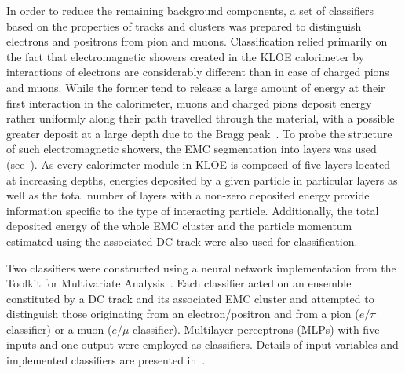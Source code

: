 In order to reduce the remaining background components, a set of classifiers based on the properties of tracks and clusters was prepared to distinguish electrons and positrons from pion and muons. Classification relied primarily on the fact that electromagnetic showers created in the KLOE calorimeter by interactions of electrons are considerably different than in case of charged pions and muons. While the former tend to release a large amount of energy at their first interaction in the calorimeter, muons and charged pions deposit energy rather uniformly along their path travelled through the material, with a possible greater deposit at a large depth due to the Bragg peak~\cite{graziani_anns}. To probe the structure of such electromagnetic showers, the EMC segmentation into layers was used (see~). As every calorimeter module in KLOE is composed of five layers located at increasing depths, energies deposited by a given particle in particular layers as well as the total number of layers with a non-zero deposited energy provide information specific to the type of interacting particle. Additionally, the total deposited energy of the whole EMC cluster and the particle momentum estimated using the associated DC track were also used for classification. 

Two classifiers were constructed using a neural network implementation from the Toolkit for Multivariate Analysis~\cite{Hocker:2007ht}. Each classifier acted on an ensemble constituted by a DC track and its associated EMC cluster and attempted to distinguish those originating from an electron/positron and from a pion ($e/\pi$ classifier) or a muon ($e/\mu$ classifier). Multilayer perceptrons (MLPs) with five inputs and one output were employed as classifiers. Details of input variables and implemented classifiers are presented in~.

